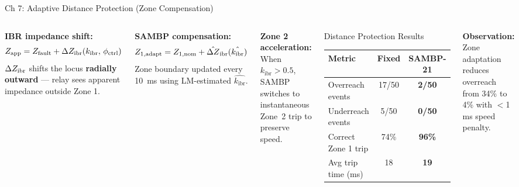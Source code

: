 \documentclass[10pt,aspectratio=169]{beamer}
\newcommand{\obs}[1]{%
  {\color{iitmred}\textbf{Observation:} #1}%
}
\newcommand{\kibr}{k_{\mathrm{ibr}}}
\begin{document}
\begin{frame}{Ch 7: Adaptive Distance Protection (Zone Compensation)}
  \begin{columns}[T]
      \textbf{IBR impedance shift:}
      \[
        Z_{\rm app} = Z_{\rm fault}
          + \Delta Z_{\rm ibr}(\kibr,\,\phi_{\rm ctrl})
      \]
      $\Delta Z_{\rm ibr}$ shifts the locus
      \textbf{radially outward} — relay sees apparent
      impedance outside Zone 1.

      \medskip
      \textbf{SAMBP compensation:}
      \[
        Z_{1,\rm adapt} = Z_{1,\rm nom}
          + \hat{\Delta Z}_{\rm ibr}(\hat{\kibr})
      \]
      Zone boundary updated every 10~ms using
      LM-estimated $\hat{\kibr}$.

      \textbf{Zone 2 acceleration:}
      When $\kibr > 0.5$, SAMBP switches to
      instantaneous Zone~2 trip to preserve speed.
      \begin{block}{\small Distance Protection Results}
        \small
        \begin{tabular}{lcc}
          \toprule
          Metric & Fixed & SAMBP-21 \\
          \midrule
          Overreach events & 17/50 & \textbf{2/50} \\
          Underreach events & 5/50 & \textbf{0/50} \\
          Correct Zone 1 trip & 74\% & \textbf{96\%} \\
          Avg trip time (ms) & 18 & \textbf{19} \\
          \bottomrule
        \end{tabular}
      \end{block}
      \vspace{0.2cm}
      \obs{Zone adaptation reduces overreach from
        34\% to 4\% with $<$1 ms speed penalty.}
  \end{columns}
\end{frame}
\end{document}
